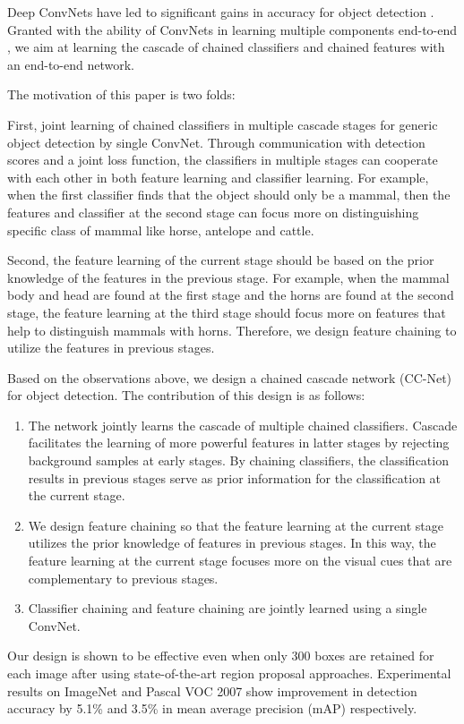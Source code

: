 \documentclass[10pt,twocolumn,letterpaper]{article}
\begin{document}
Deep ConvNets have led to significant gains in accuracy for object detection \cite{girshick2014rich, girshick2015fast}. Granted with the ability of ConvNets in learning multiple components end-to-end \cite{wan2015end}, we aim at learning the cascade of chained classifiers and chained features with an end-to-end network.



The motivation of this paper is two folds:

First, joint learning of chained classifiers in multiple cascade stages for generic object detection by single ConvNet. Through communication with detection scores and a joint loss function, the classifiers in multiple stages can cooperate with each other in both feature learning and classifier learning. For example, when the first classifier finds that the object should only be a mammal, then the features and classifier at the second stage can focus more on distinguishing specific class of mammal like horse, antelope and cattle. 

Second, the feature learning of the current stage should be based on the prior knowledge of the features in the previous stage. For example, when the mammal body and head are found at the first stage and the horns are found at the second stage, the feature learning at the third stage should focus more on features that help to distinguish mammals with horns. Therefore, we design feature chaining to utilize the features in previous stages.

Based on the observations above, we design a chained cascade network (CC-Net) for object detection. The contribution of this design is as follows:
\begin{enumerate}
\item The network jointly learns the cascade of multiple chained classifiers. Cascade facilitates the learning of more powerful features in latter stages by rejecting background samples at early stages.
 By chaining classifiers, the classification results in previous stages serve as prior information for the classification at the current stage.
\item We design feature chaining so that the feature learning at the current stage utilizes the prior knowledge of features in previous stages. In this way, the feature learning at the current stage focuses more on the visual cues that are complementary to previous stages.
\item Classifier chaining and feature chaining are jointly learned using a single ConvNet.
\end{enumerate}
Our design is shown to be effective even when only 300 boxes are retained for each image after using state-of-the-art region proposal approaches.
Experimental results on ImageNet and Pascal VOC 2007 show improvement in detection accuracy by 5.1\% and 3.5\% in mean average precision (mAP) respectively.
\end{document}
